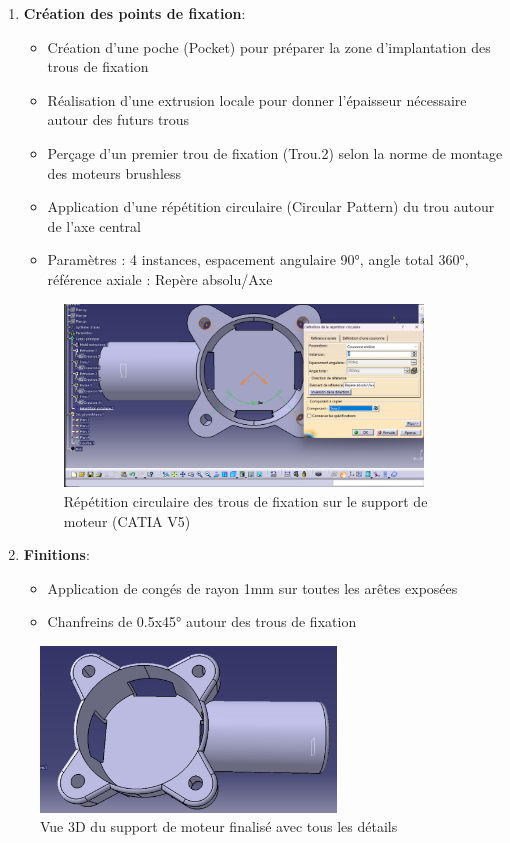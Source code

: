 \documentclass[a4paper,12pt]{report}
\begin{document}
\begin{enumerate}
    \item \textbf{Création des points de fixation}:
    \begin{itemize}
        \item Création d'une poche (Pocket) pour préparer la zone d'implantation des trous de fixation
        \item Réalisation d'une extrusion locale pour donner l'épaisseur nécessaire autour des futurs trous
        \item Perçage d'un premier trou de fixation (Trou.2) selon la norme de montage des moteurs brushless
        \item Application d'une répétition circulaire (Circular Pattern) du trou autour de l'axe central
        \item Paramètres : 4 instances, espacement angulaire 90°, angle total 360°, référence axiale : Repère absolu/Axe
    \end{itemize}
    \begin{figure}[H]
        \centering
        \includegraphics[width=0.9\textwidth]{images/repetition_circulaire_trous_support.png}
        \caption{Répétition circulaire des trous de fixation sur le support de moteur (CATIA V5)}
        \label{fig:repetition_circulaire_trous_support}
    \end{figure}
    
    \item \textbf{Finitions}:
    \begin{itemize}
        \item Application de congés de rayon 1mm sur toutes les arêtes exposées
        \item Chanfreins de 0.5x45° autour des trous de fixation
    \end{itemize}
\end{enumerate}

\begin{figure}[H]
    \centering
    \includegraphics[width=0.7\textwidth]{images/support_moteur_final.png}
    \caption{Vue 3D du support de moteur finalisé avec tous les détails}
    \label{fig:support_moteur}
\end{figure}
\end{document}
